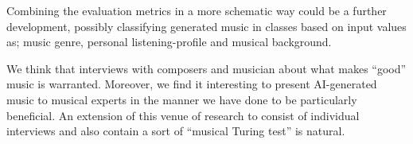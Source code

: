 \documentclass{IEEEtran}
\begin{document}
Combining the evaluation metrics in a more schematic way could be a further development, 
possibly classifying generated music in classes based on input values as;
music genre, personal listening-profile and musical background.

We think that interviews with composers and musician about what makes ``good'' music 
is warranted. Moreover, we find it interesting to present AI-generated 
music to musical experts in the manner we have done to be particularly beneficial.
An extension of this venue of research to consist of individual interviews
and also contain a sort of ``musical Turing test'' is natural.

\vspace{3em}

\printbibliography
\end{document}
